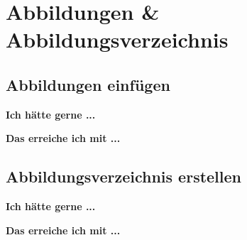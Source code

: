 \documentclass[twoside, 
               a4paper, 
               10pt, 
               parskip=full, 
               sectionentrydots=true, 
               listof=totoc, 
               listof=entryprefix,
               numbers=endperiod]{scrartcl}
\begin{document}

\newpage
\section{Abbildungen \& Abbildungsverzeichnis}
\subsection{Abbildungen einfügen}

{\textbf {Ich hätte gerne ...}}
 



\newpage
{\textbf {Das erreiche ich mit ...}}
 
\begin{miniSeite}[colbacktitle=black!35!white,title=\LaTeX-Code]

\end{miniSeite}




\newpage
\subsection{Abbildungsverzeichnis erstellen}
{\textbf {Ich hätte gerne ...}}
 
\begin{miniSeite}[colbacktitle=black!35!white,title=Ausdruck]

\end{miniSeite}


\newpage
{\textbf {Das erreiche ich mit ...}}
 
\begin{miniSeite}[colbacktitle=black!35!white,title=\LaTeX-Code]

\end{miniSeite}





\newpage
\end{document}
